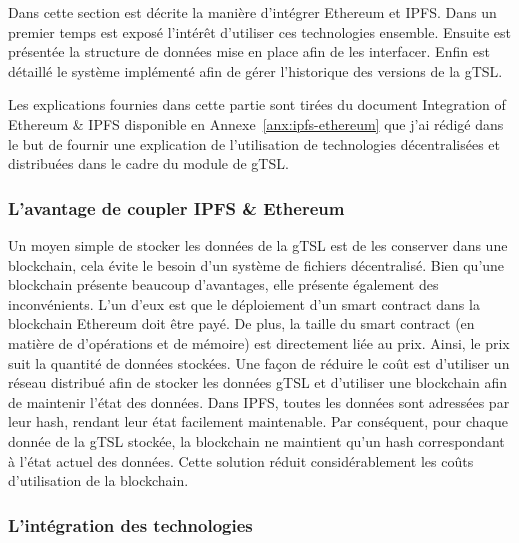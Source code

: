 \documentclass{tnreport}
\begin{document}
Dans cette section est décrite la manière d'intégrer Ethereum et IPFS. Dans un premier temps est exposé l'intérêt d'utiliser ces technologies ensemble. Ensuite est présentée la structure de données mise en place afin de les interfacer. Enfin est détaillé le système implémenté afin de gérer l'historique des versions de la gTSL.

Les explications fournies dans cette partie sont tirées du document Integration of Ethereum \& IPFS disponible en Annexe~\ref{anx:ipfs-ethereum} que j'ai rédigé dans le but de fournir une explication de l'utilisation de technologies décentralisées et distribuées dans le cadre du module de gTSL.

\subsubsection{L'avantage de coupler IPFS \& Ethereum}

Un moyen simple de stocker les données de la gTSL est de les conserver dans une blockchain, cela évite le besoin d'un système de fichiers décentralisé. 
Bien qu'une blockchain présente beaucoup d'avantages, elle présente également des inconvénients.
L'un d'eux est que le déploiement d'un smart contract dans la blockchain Ethereum doit être payé.
De plus, la taille du smart contract (en matière de d'opérations et de mémoire) est directement liée au prix.
Ainsi, le prix suit la quantité de données stockées.
Une façon de réduire le coût est d'utiliser un réseau distribué afin de stocker les données gTSL et d'utiliser une blockchain afin de maintenir l'état des données.
Dans IPFS, toutes les données sont adressées par leur hash, rendant leur état facilement maintenable. Par conséquent, pour chaque donnée de la gTSL stockée, la blockchain ne maintient qu'un hash correspondant à l'état actuel des données. Cette solution réduit considérablement les coûts d'utilisation de la blockchain.

\subsubsection{L'intégration des technologies}
\end{document}

